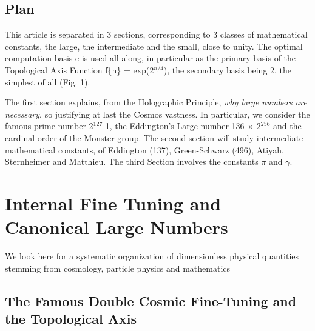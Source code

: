 \documentclass[twoside,draft]{article}
\begin{document}
\begin{sloppypar}
{\subsection{Plan}
This article is separated in 3 sections, corresponding to 3 classes of mathematical constants, the large, the intermediate and the small, close to unity. The optimal computation basis e is used all along, in particular as the primary basis of the Topological Axis Function f\{n\} = exp(2$^{n/4}$), the secondary basis being 2, the simplest of all (Fig. 1).

The first section explains, from the Holographic Principle, \textit{why large numbers are necessary}, so justifying at last the Cosmos vastness. In particular, we consider the famous prime number 2$^{127}\!$-1, the Eddington's Large number 136 $\times$ 2$^{256}\!$ and the cardinal order of the Monster group. The second section will study intermediate mathematical constants, of Eddington (137), Green-Schwarz (496), Atiyah, Sternheimer and Matthieu. The third Section involves the constants $\pi$ and $\gamma$. 

\section {Internal Fine Tuning and Canonical Large Numbers}
We look here for a systematic organization of dimensionless physical quantities stemming from cosmology, particle physics and mathematics
\subsection {The Famous Double Cosmic Fine-Tuning and the Topological Axis}

}
\end{sloppypar}
\end{document}
